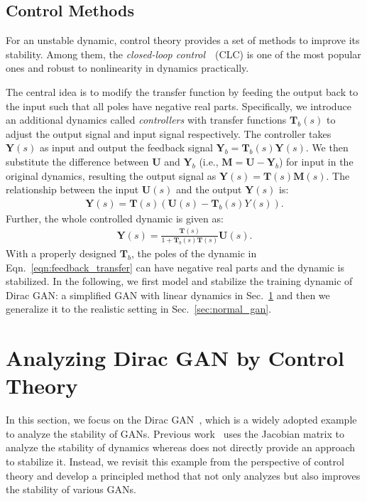 \documentclass{article}
\newcommand{\fY}{\bm{Y}}
\newcommand{\fU}{\bm{U}}
\newcommand{\fT}{\bm{T}}
\newcommand{\fM}{\bm{M}}
\newcommand{\eqn}[1]{Eqn.~\eqref{eqn:#1}}
\newcommand{\secref}[1]{Sec.~\ref{sec:#1}} \usepackage{wrapfig}
\theoremstyle{definition}
\begin{document}
\subsection{Control Methods}
\label{sec:control_method}


For an unstable dynamic, control theory provides a set of methods to improve its stability. Among them, 
the {\it closed-loop control}~\cite{kailath1980linear}~(CLC) is one of the most popular ones and robust to nonlinearity in dynamics practically. 

The central idea is to modify the transfer function by feeding the output back to the input such that all poles have negative real parts.
Specifically, we introduce an additional dynamics called {\it controllers} with transfer functions $\fT_b(s)$ to adjust the output signal and input signal respectively. The controller takes $\fY(s)$ as input and output the feedback signal $\fY_b = \fT_b(s)\fY(s)$. We then substitute the difference between $\fU$ and $\fY_b$ (i.e., $\fM = \fU-\fY_b$) for input in the original dynamics, resulting the output signal as $\fY(s) = \fT(s)\fM(s)$. The relationship between the input $\fU(s)$ and the output $\fY(s)$ is:
\begin{align}
\fY(s) = \fT(s)(\fU(s) - \fT_b(s)Y(s)).\label{eqn:feed_back_negative}
\end{align}
Further, the whole controlled dynamic is given as:
\begin{align}
\fY(s)=\frac{\fT(s)}{1+\fT_b(s)\fT(s)}\fU(s).\label{eqn:feedback_transfer}
\end{align}
With a properly designed $\fT_b$, the poles of the dynamic in \eqn{feedback_transfer} can have negative real parts and the dynamic is stabilized. In the following, we first model and stabilize the training dynamic of Dirac GAN: a simplified GAN with linear dynamics in \secref{dirac_gan} and then we generalize it to the realistic setting in \secref{normal_gan}.

\section{Analyzing Dirac GAN by Control Theory}\label{sec:dirac_gan}


In this section, we focus on the Dirac GAN~\cite{mescheder2018training}, which is a widely adopted example to analyze the stability of GANs.
Previous work~\cite{mescheder2017numerics,gidel2018negative} uses the Jacobian matrix to analyze the stability of dynamics whereas does not directly provide an approach to stabilize it. Instead, we revisit this example from the perspective of control theory and develop a principled method that not only analyzes but also improves the stability of various GANs.
\end{document}
